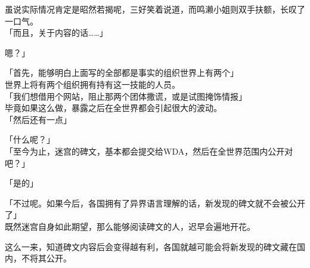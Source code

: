 虽说实际情况肯定是昭然若揭呢，三好笑着说道，而鸣濑小姐则双手扶额，长叹了一口气。\\

「而且，关于内容的话……」

嗯？」

「首先，能够明白上面写的全部都是事实的组织世界上有两个」\\

世界上将有两个组织拥有持有这一技能的人员。\\

「我们想借用个网站，阻止那两个团体撒谎，或是试图掩饰情报」\\

毕竟如果这么做，暴露之后在全世界都会引起很大的波动。\\

「然后还有一点」

「什么呢？」\\

「至今为止，迷宫的碑文，基本都会提交给WDA，然后在全世界范围内公开对吧？」

「是的」

「不过呢。如果今后，各国拥有了异界语言理解的话，新发现的碑文就不会被公开了」\\

既然迷宫自身如此期望，那么能够阅读碑文的人，迟早会遍地开花。

这么一来，知道碑文内容后会变得越有利，各国就越可能会将新发现的碑文藏在国内，不将其公开。\\

